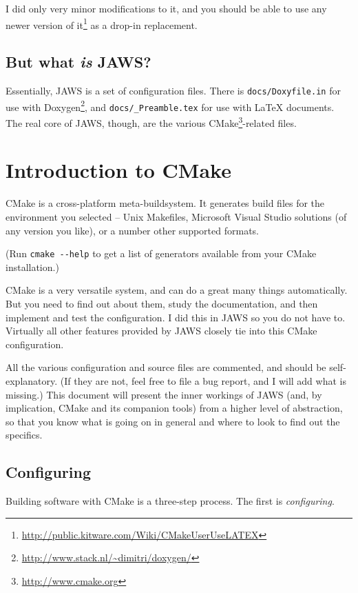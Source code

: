 I did only very minor modifications to it, and you should be able to use any newer version of it\footnote{\url{http://public.kitware.com/Wiki/CMakeUserUseLATEX}} as a drop-in replacement.

\subsection{But what \emph{is} JAWS?}

Essentially, JAWS is a set of configuration files. There is \lstinline{docs/Doxyfile.in} for use with Doxygen\footnote{\url{http://www.stack.nl/~dimitri/doxygen/}}, and \lstinline{docs/_Preamble.tex} for use with \LaTeX{} documents. The real core of JAWS, though, are the various CMake\footnote{\url{http://www.cmake.org}}-related files.

\section{Introduction to CMake}

CMake is a cross-platform meta-buildsystem. It generates build files for the environment you selected -- Unix Makefiles, Microsoft Visual Studio solutions (of any version you like), or a number other supported formats.

(Run \lstinline{cmake --help} to get a list of generators available from your CMake installation.)

CMake is a very versatile system, and can do a great many things automatically. But you need to find out about them, study the documentation, and then implement and test the configuration. I did this in JAWS so you do not have to. Virtually all other features provided by JAWS closely tie into this CMake configuration.

All the various configuration and source files are commented, and should be self-explanatory. (If they are not, feel free to file a bug report, and I will add what is missing.) This document will present the inner workings of JAWS (and, by implication, CMake and its companion tools) from a higher level of abstraction, so that you know what is going on in general and where to look to find out the specifics.

\subsection{Configuring}

Building software with CMake is a three-step process. The first is \emph{configuring}.

